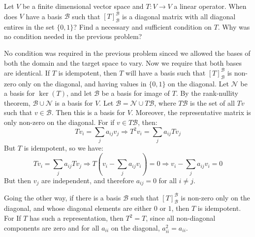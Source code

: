 \documentclass[crop=false,class=article]{standalone}                           %
\begin{document}
        \begin{problem}
            Let $V$ be a finite dimensional vector space and
            $T:V\rightarrow{V}$ a linear operator. When does $V$ have a
            basis $\mathscr{B}$ such that $[T]_{\mathscr{B}}^{\mathscr{B}}$
            is a diagonal matrix with all diagonal entires in the set
            $\{0,1\}$? Find a necessary and sufficient condition on $T$.
            Why was no condition needed in the previous problem?
        \end{problem}
        \begin{solution}
            No condition was required in the previous problem sinced we
            allowed the bases of both the domain and the target space to
            vary. Now we require that both bases are identical. If
            $T$ is idempotent, then $T$ will have a basis such that
            $[T]_{\mathscr{B}}^{\mathscr{B}}$ is non-zero only on the
            diagonal, and having values in $\{0,1\}$ on the diagonal.
            Let $\mathcal{N}$ be a basis for $\ker(T)$, and let
            $\mathcal{B}$ be a basis for image of $T$. By the rank-nullity
            theorem, $\mathcal{B}\cup\mathcal{N}$ is a basis for $V$.
            Let $\mathscr{B}=\mathcal{N}\cup{T}\mathcal{B}$, where
            $T\mathcal{B}$ is the set of all $Tv$ such that
            $v\in\mathcal{B}$. Then this is a basis for $V$. Moreover,
            the representative matrix is only non-zero on the diagonal.
            For if $v\in{T}\mathcal{B}$, then:
            \begin{equation}
                Tv_{i}=\sum_{j}a_{ij}v_{j}
                \Longrightarrow
                T^{2}v_{i}=\sum_{j}a_{ij}Tv_{j}
            \end{equation}
            But $T$ is idempotent, so we have:
            \begin{equation}
                Tv_{i}=\sum_{j}a_{ij}Tv_{j}
                \Longrightarrow
                T(v_{i}-\sum_{j}a_{ij}v_{i})=0
                \Longrightarrow
                v_{i}-\sum_{j}a_{ij}v_{i}=0
            \end{equation}
            But then $v_{j}$ are independent, and therefore
            $a_{ij}=0$ for all $i\ne{j}$.
            \par\hfill\par
            Going the other way, if there is a basis $\mathscr{B}$ such
            that $[T]_{\mathscr{B}}^{\mathscr{B}}$ is non-zero only on
            the diagonal, and whose diagonal elements are either $0$ or
            $1$, then $T$ is idempotent. For If $T$ has such a
            representation, then $T^{2}=T$, since all non-diagonal
            components are zero and for all $a_{ii}$ on the diagonal,
            $a_{ii}^{2}=a_{ii}$.
        \end{solution}
\end{document}
